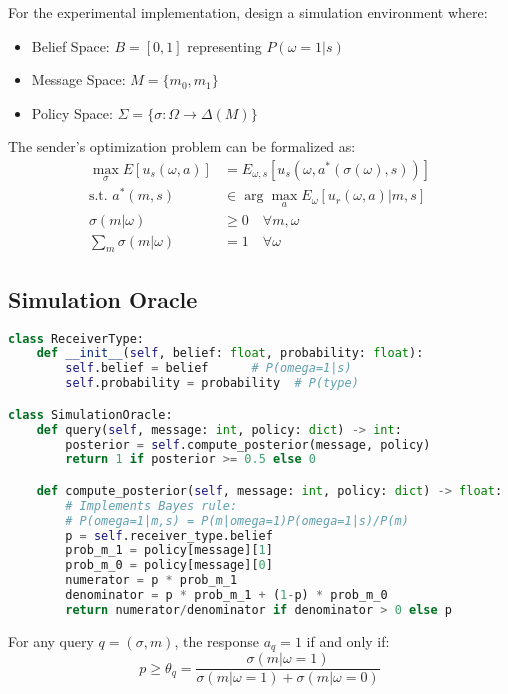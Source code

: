 \documentclass[12pt]{article}
\theoremstyle{plain}
\theoremstyle{definition}
\theoremstyle{remark}
\begin{document}
For the experimental implementation, design a simulation environment where:
\begin{itemize}
    \item Belief Space: $B = [0,1]$ representing $P(\omega=1|s)$
    \item Message Space: $M = \{m_0, m_1\}$
    \item Policy Space: $\Sigma = \{\sigma: \Omega \rightarrow \Delta(M)\}$
\end{itemize}

The sender's optimization problem can be formalized as:
\begin{align*}
    \max_\sigma E[u_s(\omega,a)] &= E_{\omega,s}[u_s(\omega,a^*(\sigma(\omega),s))] \\
    \text{s.t. } a^*(m,s) &\in \arg\max_a E_\omega[u_r(\omega,a)|m,s] \\
    \sigma(m|\omega) &\geq 0 \quad \forall m,\omega \\
    \sum_m \sigma(m|\omega) &= 1 \quad \forall\omega
\end{align*}

\subsection{Simulation Oracle}

\begin{lstlisting}[language=Python, caption=Core Implementation Classes]
class ReceiverType:
    def __init__(self, belief: float, probability: float):
        self.belief = belief      # P(omega=1|s)
        self.probability = probability  # P(type)

class SimulationOracle:
    def query(self, message: int, policy: dict) -> int:
        posterior = self.compute_posterior(message, policy)
        return 1 if posterior >= 0.5 else 0

    def compute_posterior(self, message: int, policy: dict) -> float:
        # Implements Bayes rule:
        # P(omega=1|m,s) = P(m|omega=1)P(omega=1|s)/P(m)
        p = self.receiver_type.belief
        prob_m_1 = policy[message][1]
        prob_m_0 = policy[message][0]
        numerator = p * prob_m_1
        denominator = p * prob_m_1 + (1-p) * prob_m_0
        return numerator/denominator if denominator > 0 else p
\end{lstlisting}

For any query $q = (\sigma, m)$, the response $a_q = 1$ if and only if:
\begin{equation}
    p \geq \theta_q = \frac{\sigma(m|\omega=1)}{\sigma(m|\omega=1) + \sigma(m|\omega=0)}
\end{equation}
\end{document}
